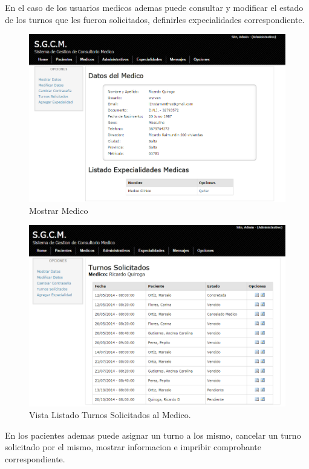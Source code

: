 En el caso de los usuarios medicos ademas puede consultar y modificar el estado
de los turnos que les fueron solicitados, definirles expecialidades
correspondiente.

\begin{figure}[H]
    \centering
    \includegraphics[scale=0.5]{resourse/datos-medico-a.png}
    \caption{Mostrar Medico}
    \label{fig:614}
\end{figure}


\begin{figure}[H]
    \centering
    \includegraphics[scale=0.5]{resourse/turnos-sol-medico.png}
    \caption{Vista Listado Turnos Solicitados al Medico.}
    \label{fig:617}
\end{figure}


En los pacientes ademas puede asignar un turno a los mismo, cancelar un turno
solicitado por el mismo, mostrar informacion e impribir comprobante
correspondiente.

